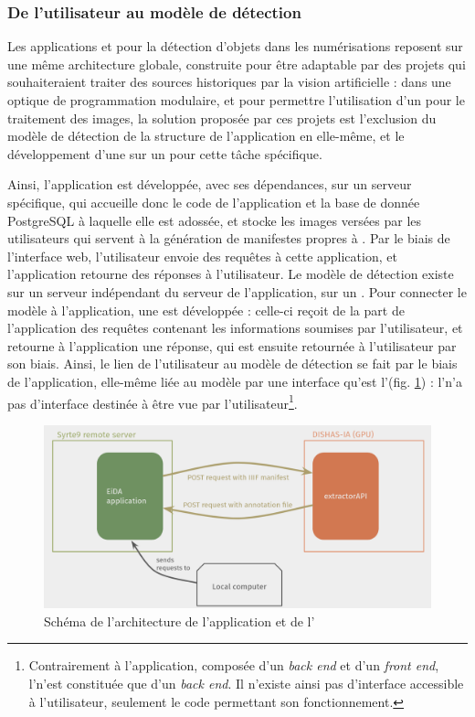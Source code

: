     \subsubsection{De l'utilisateur au modèle de détection}
	Les applications \vhs et \eida pour la détection d'objets dans les numérisations reposent sur une même architecture globale, construite pour être adaptable par des projets qui souhaiteraient traiter des sources historiques par la vision artificielle : dans une optique de programmation modulaire, et pour permettre l'utilisation d'un \gpu pour le traitement des images, la solution proposée par ces projets est l'exclusion du modèle de détection de la structure de l'application en elle-même, et le développement d'une \api sur un \gpu pour cette tâche spécifique.
	
	Ainsi, l'application est développée, avec ses dépendances, sur un serveur spécifique, qui accueille donc le code de l'application et la base de donnée PostgreSQL à laquelle elle est adossée, et stocke les images versées par les utilisateurs qui servent à la génération de manifestes \iiif propres à \eida. Par le biais de l'interface web, l'utilisateur envoie des requêtes à cette application, et l'application retourne des réponses à l'utilisateur. Le modèle de détection existe sur un serveur indépendant du serveur de l'application, sur un \gpu. Pour connecter le modèle à l'application, une \api est développée : celle-ci reçoit de la part de l'application \eida des requêtes contenant les informations soumises par l'utilisateur, et retourne à l'application une réponse, qui est ensuite retournée à l'utilisateur par son biais. Ainsi, le lien de l'utilisateur au modèle de détection se fait par le biais de l'application, elle-même liée au modèle par une interface qu'est l'\api (fig. \ref{fig:archi_eida}) : l'\api n'a pas d'interface destinée à être vue par l'utilisateur\footnote{Contrairement à l'application, composée d'un \textit{back end} et d'un \textit{front end}, l'\api n'est constituée que d'un \textit{back end}. Il n'existe ainsi pas d'interface accessible à l'utilisateur, seulement le code permettant son fonctionnement.}.
	
	\begin{figure}[h]
		\centering
		\includegraphics[width=15cm]{images/schema_archi.png}
		\caption{Schéma de l'architecture de l'application \eida et de l'\api \exapi}
		\label{fig:archi_eida}
	\end{figure}

